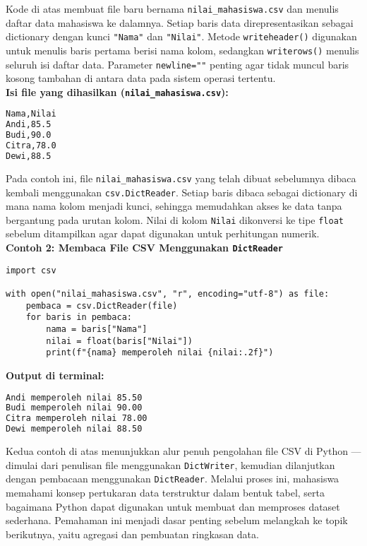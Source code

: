 Kode di atas membuat file baru bernama \texttt{nilai\_mahasiswa.csv} dan menulis daftar data mahasiswa ke dalamnya.  
Setiap baris data direpresentasikan sebagai dictionary dengan kunci \texttt{"Nama"} dan \texttt{"Nilai"}.  
Metode \texttt{writeheader()} digunakan untuk menulis baris pertama berisi nama kolom, sedangkan \texttt{writerows()} menulis seluruh isi daftar data.  
Parameter \texttt{newline=""} penting agar tidak muncul baris kosong tambahan di antara data pada sistem operasi tertentu.\\

\noindent\textbf{Isi file yang dihasilkan (\texttt{nilai\_mahasiswa.csv}):}

\begin{lstlisting}[language=bash, caption={Hasil isi file nilai_mahasiswa.csv}]
Nama,Nilai
Andi,85.5
Budi,90.0
Citra,78.0
Dewi,88.5
\end{lstlisting}

Pada contoh ini, file \texttt{nilai\_mahasiswa.csv} yang telah dibuat sebelumnya dibaca kembali menggunakan \texttt{csv.DictReader}.  
Setiap baris dibaca sebagai dictionary di mana nama kolom menjadi kunci, sehingga memudahkan akses ke data tanpa bergantung pada urutan kolom.  
Nilai di kolom \texttt{Nilai} dikonversi ke tipe \texttt{float} sebelum ditampilkan agar dapat digunakan untuk perhitungan numerik.\\

\noindent\textbf{Contoh 2: Membaca File CSV Menggunakan \texttt{DictReader}}

\begin{lstlisting}[style=PythonStyle, caption={Membaca data CSV menggunakan csv.DictReader}]
import csv

with open("nilai_mahasiswa.csv", "r", encoding="utf-8") as file:
    pembaca = csv.DictReader(file)
    for baris in pembaca:
        nama = baris["Nama"]
        nilai = float(baris["Nilai"])
        print(f"{nama} memperoleh nilai {nilai:.2f}")
\end{lstlisting}



\noindent\textbf{Output di terminal:}

\begin{lstlisting}[language=bash, caption={Hasil output pembacaan file CSV}]
Andi memperoleh nilai 85.50
Budi memperoleh nilai 90.00
Citra memperoleh nilai 78.00
Dewi memperoleh nilai 88.50
\end{lstlisting}

Kedua contoh di atas menunjukkan alur penuh pengolahan file CSV di Python — dimulai dari penulisan file menggunakan \texttt{DictWriter}, kemudian dilanjutkan dengan pembacaan menggunakan \texttt{DictReader}.  
Melalui proses ini, mahasiswa memahami konsep pertukaran data terstruktur dalam bentuk tabel, serta bagaimana Python dapat digunakan untuk membuat dan memproses dataset sederhana.  
Pemahaman ini menjadi dasar penting sebelum melangkah ke topik berikutnya, yaitu agregasi dan pembuatan ringkasan data.



